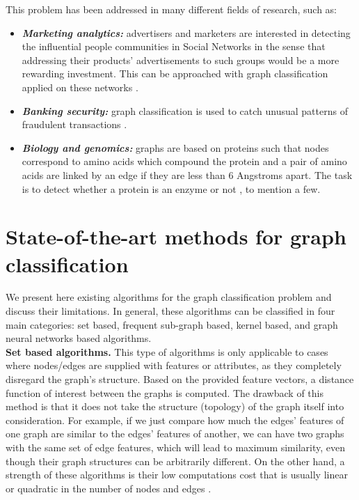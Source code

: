 This problem has been addressed in many different fields of research, such as:
\begin{itemize}
    \item \textbf{\emph{Marketing analytics:}} advertisers and marketers  are interested in detecting the influential people communities in Social Networks in the sense that addressing their products' advertisements to such groups would be a more rewarding investment. This can be approached with graph classification applied on these networks \citep{marketing_analytics}.
    \item \textbf{\emph{Banking security:}} graph classification is used to catch unusual patterns of fraudulent transactions \citep{banking_security}.
    \item \textbf{\emph{Biology and genomics:}} graphs are based on proteins such that nodes correspond
to amino acids which compound the protein and a pair of amino acids are linked by an edge if they are less than 6 Angstroms apart. The task is to detect whether a protein is an enzyme or not \citep{protein_application}, to mention a few.
\end{itemize}

\section{State-of-the-art methods for graph classification}
\label{section:state}
We  present here existing algorithms for the graph classification problem and discuss their limitations. In general, these algorithms can be classified in four main categories: set based, frequent sub-graph based, kernel based, and graph neural networks based algorithms.\\

\noindent\textbf{Set based algorithms.} This type of algorithms is only applicable to cases where nodes/edges are supplied with features or attributes, as they completely disregard the graph's structure. Based on the provided feature vectors, a distance function of interest between the graphs is computed. %
The drawback of this method is that it does not take the structure (topology) of the graph itself into consideration. For example, if we just compare how much the edges' features of one graph are similar to the edges' features of another, we can have two graphs with the same set of edge features, which will lead to maximum similarity, even though their graph structures can be arbitrarily different. %
On the other hand, a strength of these algorithms is their low computations cost that is usually linear or quadratic in the number of nodes and edges \citep{graphlet_kernel}.\\
 
